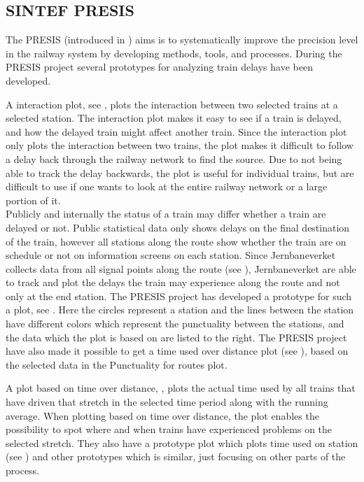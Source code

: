 \subsection{SINTEF PRESIS}
\label{sub:subsection_sintefPresis}

The PRESIS (introduced in ) aims is to systematically improve the precision level in the railway system by developing methods, tools, and processes. During the PRESIS project several prototypes for analyzing train delays have been developed.

A interaction plot, see , plots the interaction
between two selected trains at a selected station. The interaction plot makes 
it easy to see if a train is delayed, and how the delayed train might affect 
another train. Since the interaction plot only plots the interaction between 
two trains, the plot makes it difficult to follow a delay back through the 
railway network to find the source. Due to not being able to track the delay
backwards, the plot is useful for individual trains, but are difficult to use
if one wants to look at the entire railway network or a large portion of it. \\

Publicly and internally the status of a train may differ whether a train are 
delayed or not. Public statistical data only shows delays on the final 
destination of the train, however all stations along the route show whether 
the train are on schedule or not on information screens on each station. Since 
Jernbaneverket collects data from all signal points along the route (see 
), Jernbaneverket are able to track and 
plot the delays the train may experience along the route and not only at the 
end station. The PRESIS project has developed a prototype for such a plot, see 
. Here the circles represent a station and the lines 
between the station have different colors which represent the punctuality 
between the stations, and the data which the plot is based on are listed to 
the right. The PRESIS project have also made it possible to get a time used 
over distance plot (see ), based on the 
selected data in the Punctuality for routes plot. 

A plot based on time over distance, , plots the
actual time used by all trains that have driven that stretch in the selected
time period along with the running average. When plotting based on time over 
distance, the plot enables the possibility to spot where and
when trains have experienced problems on the selected stretch. They also have a
prototype plot which plots time used on station (see )
and other prototypes which is similar, just focusing on other parts of the
process.  %


